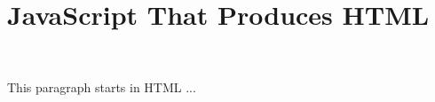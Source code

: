 \documentclass{article}
\begin{document}
\section*{JavaScript That Produces HTML }
~

\noindent This paragraph starts in HTML ... 
\end{document}

